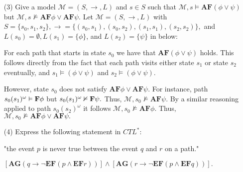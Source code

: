 \documentclass{article}
\begin{document}
\begin{enumerate}
\begin{itemize}
    \end{itemize}
    
    \item [(3)] Give a model $\mathcal M=(S,\to,L)$ and $s\in S$ such that $\mathcal M,s\vDash\textbf{AF}(\phi\lor\psi)$ but $\mathcal M,s\nvDash\textbf{AF}\phi\lor\textbf{AF}\psi.$
    Let $\mathcal M = (S, \to, L)$ with $S=\{s_0, s_1, s_2\}, \to=\{(s_0,s_1),(s_0,s_2),(s_1,s_1),(s_2,s_2)\},$ and $L(s_0)=\emptyset,L(s_1)=\{\phi\}$, and $L(s_2)=\{\psi\}$ in below:

    

    For each path that starts in state $s_0$ we have that $\textbf{AF}(\phi\lor\psi)$ holds. This follows directly from the fact that each path
    visits either state $s_1$ or state $s_2$ eventually, and $s_1\vDash(\phi\lor\psi)$ and $s_2\vDash(\phi\lor\psi).$ 
    
    However, state $s_0$ does not satisfy $\textbf{AF}\phi\lor\textbf{AF}\psi.$ For instance, path $s_0(s_1)^\omega\vDash\textbf F\phi$ but $s_0(s_1)^\omega\nvDash\textbf F\psi.$ Thus, $\mathcal M, s_0\nvDash\textbf{AF}\psi$. By a similar reasoning applied
    to path $s_0(s_2)^\omega$ it follows $\mathcal M, s_0\nvDash\textbf{AF}\phi.$ Thus, $\mathcal M, s_0\nvDash\textbf{AF}\phi\lor\textbf{AF}\psi.$

    \item [(4)] Express the following statement in $CTL^*$:
    \begin{center}
        "the event $p$ is never true between the event $q$ and $r$ on a path."
    \end{center}
    $[\textbf{AG}(q\to\neg\textbf{EF}(p\land\textbf{EF}r))]\land[\textbf{AG}(r\to\neg\textbf{EF}(p\land\textbf{EF}q))].$



\end{enumerate}
\end{document}
